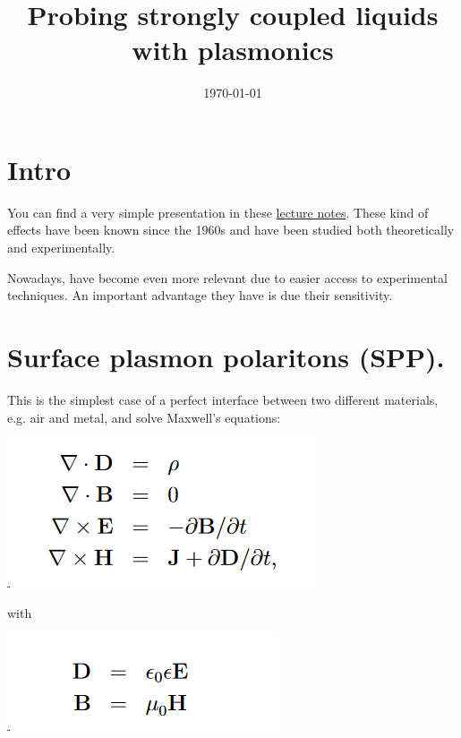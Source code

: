 \documentclass[11pt]{article}
\date{\today}
\title{Probing strongly coupled liquids with plasmonics}
\begin{document}
\maketitle
\tableofcontents


\section{Intro}
\label{sec:orgc32f1f0}

You can find a very simple presentation in these \href{./plasmonics-lecture-notes.pdf}{lecture notes}. These
kind of effects have been known since the 1960s and have been studied
both theoretically and experimentally.


Nowadays, have become even more relevant due to easier access to
experimental techniques. An important advantage they have is due their
sensitivity.


\section{Surface plasmon polaritons (SPP).}
\label{sec:org351a38c}

This is the simplest case of a perfect interface between two different
materials, e.g. air and metal, and solve Maxwell's
equations:


\begin{center}
\includegraphics[width=.9\linewidth]{./Surface_plasmon_polaritons_(SPP)/2023-08-22_15-07-26_screenshot.png}
\end{center}

with

\begin{center}
\includegraphics[width=.9\linewidth]{./Surface_plasmon_polaritons_(SPP)/2023-08-22_15-11-15_screenshot.png}
\end{center}
\end{document}
